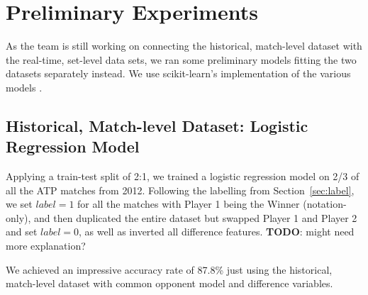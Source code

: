 \documentclass[paper=a4, fontsize=11pt]{scrartcl} %
\numberwithin{equation}{section} %
\numberwithin{figure}{section} %
\numberwithin{table}{section} %
\begin{document}

\section{Preliminary Experiments}
As the team is still working on connecting the historical, match-level dataset with the real-time, set-level data sets, we ran some preliminary models fitting the two datasets separately instead. We use scikit-learn's implementation of the various models \cite{scikit-learn}.
\subsection{Historical, Match-level Dataset: Logistic Regression Model}
Applying a train-test split of 2:1, we trained a logistic regression model on 2/3 of all the ATP matches from 2012. Following the labelling from Section~\ref{sec:label}, we set $label = 1$ for all the matches with Player 1 being the Winner (notation-only), and then duplicated the entire dataset but swapped Player 1 and Player 2 and set $label = 0$, as well as inverted all difference features. \textbf{TODO}: might need more explanation? 

We achieved an impressive accuracy rate of 87.8\% just using the historical, match-level dataset with common opponent model and difference variables. 
\end{document}
